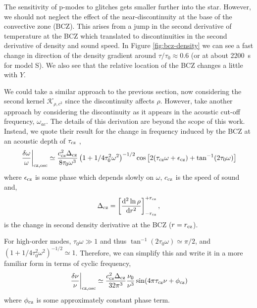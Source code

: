 The sensitivity of p-modes to glitches gets smaller further into the star. However, we should not neglect the effect of the near-discontinuity at the base of the convective zone (BCZ). This arises from a jump in the second derivative of temperature at the BCZ which translated to discontinuities in the second derivative of density and sound speed. In Figure \ref{fig:bcz-density} we can see a fast change in direction of the density gradient around \(\tau/\tau_0 \approx 0.6\) (or at about \SI{2200}{\second} for model S). We also see that the relative location of the BCZ changes a little with \(Y\).


We could take a similar approach to the previous section, now considering the second kernel \(\mathcal{K}_{\rho,c^2}\) since the discontinuity affects \(\rho\). However, \citet{Houdek.Gough2007} take another approach by considering the discontinuity as it appears in the acoustic cut-off frequency, \(\omega_{ac}\). The details of this derivation are beyond the scope of this work. Instead, we quote their result for the change in frequency induced by the BCZ at an acoustic depth of \(\tau_{{\mathrm{cz}}}\) \citep[cf.][Eq. 17]{Houdek.Gough2007},
%
\begin{equation}
    \left.\frac{\delta\omega}{\omega}\right|_{{\mathrm{cz}},\mathrm{osc}} \simeq \frac{c_{{\mathrm{cz}}}^2\Delta_{{\mathrm{cz}}}}{8\tau_0 \omega^3} \left(1 + {1}/{4\tau_0^2\omega^2}\right)^{-1/2} \cos\left[2(\tau_{{\mathrm{cz}}} \omega + \epsilon_{{\mathrm{cz}}}) + \tan^{-1}(2\tau_0\omega)\right]
\end{equation}
%
where \(\epsilon_{{\mathrm{cz}}}\) is some phase which depends slowly on \(\omega\), \(c_{{\mathrm{cz}}}\) is the speed of sound and,
%
\begin{equation}
    \Delta_{{\mathrm{cz}}} = \left[\frac{\mathrm{d}^2 \ln\rho}{\mathrm{d} r^2}\right]_{-r_{{\mathrm{cz}}}}^{+r_{{\mathrm{cz}}}},
\end{equation}
%
is the change in second density derivative at the BCZ (\(r = r_{{\mathrm{cz}}}\)).

For high-order modes, \(\tau_0 \omega \gg 1\) and thus \(\tan^{-1}(2\tau_0\omega) \simeq \pi/2\), and \((1 + {1}/{4\tau_0^2\omega^2})^{-1/2} \simeq 1\). Therefore, we can simplify this and write it in a more familiar form in terms of cyclic frequency,
%
\begin{equation}
    \left.\frac{\delta\nu}{\nu}\right|_{{\mathrm{cz}},\mathrm{osc}} \simeq \frac{c_{{\mathrm{cz}}}^2\Delta_{{\mathrm{cz}}}}{32\pi^3}\frac{\nu_0}{\nu^3} \sin(4\pi\tau_{{\mathrm{cz}}}\nu + \phi_{{\mathrm{cz}}}) \label{eq:bcz-osc}
\end{equation}
%
where \(\phi_{{\mathrm{cz}}}\) is some approximately constant phase term.

